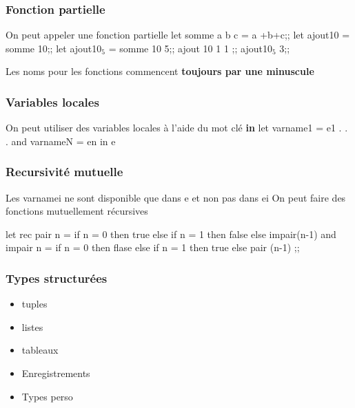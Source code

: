 \documentclass[11pt]{article}
\begin{document}
\subsubsection{Fonction partielle}
\label{sec-1-4-1}
On peut appeler une fonction partielle
let somme a b c = a +b+c;;
let ajout10 = somme 10;;
let ajout10$_{\text{5}}$ = somme 10 5;;
ajout 10 1 1 ;;
ajout10$_{\text{5}}$ 3;;


Les noms pour les fonctions commencent \textbf{toujours par une minuscule}
\subsubsection{Variables locales}
\label{sec-1-4-2}
On peut utiliser des variables locales à l'aide du mot clé \textbf{in}
let varname1 = e1
   .
   .
   .
and varnameN = en
in e

\subsubsection{Recursivité mutuelle}
\label{sec-1-4-3}
Les varnamei ne sont disponible que dans e et non pas dans ei
On peut faire des fonctions mutuellement récursives 

let rec pair n =
  if n = 0 then true else 
  if n = 1 then false else impair(n-1)
and impair n =
  if n = 0 then flase else 
  if n = 1 then true else pair (n-1)
  ;;

\subsubsection{Types structurées}
\label{sec-1-4-4}
\begin{itemize}
\item tuples
\item listes
\item tableaux
\item Enregistrements
\item Types perso
\end{itemize}
\end{document}
